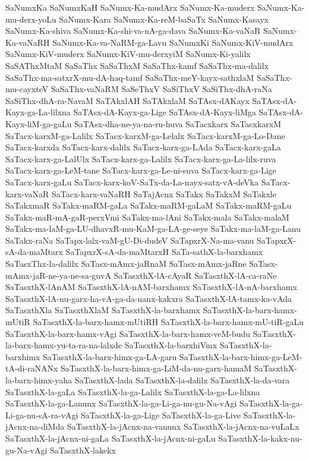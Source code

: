 {SaNumxKa
SaNumxKaH
SaNumx-Ka-mudArx
SaNumx-Ka-muderx
SaNumx-Ka-mu-derx-yoLu
SaNumx-Kara
SaNumx-Ka-reM-baSaTx
SaNumx-Kasayx
SaNumx-Ka-shiva
SaNumx-Ka-shi-va-nA-ga-dava
SaNumx-Ka-vaNaR
SaNumx-Ka-vaNaRH
SaNumx-Ka-va-NaRM-ga-Lavu
SaNumxKi
SaNumx-KiV-mudArx
SaNumx-KiV-muderx
SaNumx-KiV-mu-derxyiM
SaNumx-Ki-yalilx
SaSAThxMtaM
SaSaThx
SaSaThxM
SaSaThx-kamf
SaSaThx-ma-dalilx
SaSaThx-ma-satxrX-mu-dA-haq-tamf
SaSaThx-meY-kayx-sathxlaM
SaSaThx-mu-cayxteV
SaSaThx-vaNaRM
SaSeThxV
SaSiThxV
SaSiThx-dhA-raNa
SaSiThx-dhA-ra-NavaM
SaTAkxlAH
SaTAkxlaM
SaTAsx-dAKayx
SaTAsx-dA-Kayx-ga-La-lilxna
SaTAsx-dA-Kayx-ga-Lige
SaTAsx-dA-Kayx-liMga
SaTAsx-dA-Kayx-liM-ga-gaLu
SaTAsx-dha-ne-ya-na-ru-huva
SaTacxkarx
SaTacxkarxM
SaTacx-karxM-ga-Lalilx
SaTacx-karxM-ga-Lelalx
SaTacx-karxM-ga-Lo-Dane
SaTacx-karxda
SaTacx-karx-dalilx
SaTacx-karx-ga-LAda
SaTacx-karx-gaLa
SaTacx-karx-ga-LalUlx
SaTacx-karx-ga-Lalilx
SaTacx-karx-ga-La-lilx-ruva
SaTacx-karx-ga-LeM-tane
SaTacx-karx-ga-Le-ni-suva
SaTacx-karx-ga-Lige
SaTacx-karx-gaLu
SaTacx-karx-koV-SaTx-da-La-nayx-satx-vA-deVka
SaTacx-karx-vaNaR
SaTacx-karx-vaNaRH
SaTajAcnx
SaTakx
SaTakxM
SaTakxle
SaTakxmaR
SaTakx-maRM-gaLa
SaTakx-maRM-gaLaM
SaTakx-maRM-gaLu
SaTakx-maR-mA-gaR-perxVmi
SaTakx-ma-lAni
SaTakx-mala
SaTakx-malaM
SaTakx-ma-laM-ga-LU-dhavxR-mu-KaM-ga-LA-ge-seye
SaTakx-ma-laM-ga-Lanu
SaTakx-raNa
SaTapx-lalx-vaM-gU-Di-dudeV
SaTapxrX-Na-ma-vanu
SaTapxrX-sA-da-maMtarx
SaTapxrX-sA-da-maMtarxH
SaTa-sathX-la-barxhamx
SaTasxThx-la-dalilx
SaTasx-mAmx-jaRnaM
SaTasx-mAmx-jaRne
SaTasx-mAmx-jaR-ne-ya-ne-sa-guvA
SaTasxthX-lA-cAyaR
SaTasxthX-lA-ca-raNe
SaTasxthX-lAnAM
SaTasxthX-lA-nAM-barxhamx
SaTasxthX-lA-nA-barxhamx
SaTasxthX-lA-nu-garx-ha-vA-ga-da-nanx-kakxra
SaTasxthX-lA-tamx-ka-vAda
SaTasxthXla
SaTasxthXlaM
SaTasxthX-la-barxhamx
SaTasxthX-la-barx-hamx-mUtiR
SaTasxthX-la-barx-hamx-mUtiRH
SaTasxthX-la-barx-hamx-mU-tiR-gaLu
SaTasxthX-la-barx-hamx-vAgi
SaTasxthX-la-barx-hamx-veM-budu
SaTasxthX-la-barx-hamx-yu-ta-ra-na-lalxde
SaTasxthX-la-barxhiVmx
SaTasxthX-la-barxhimx
SaTasxthX-la-barx-himx-ga-LA-garu
SaTasxthX-la-barx-himx-ga-LeM-tA-di-raNANx
SaTasxthX-la-barx-himx-ga-LiM-da-nu-garx-hamaM
SaTasxthX-la-barx-himx-yaha
SaTasxthX-lada
SaTasxthX-la-dalilx
SaTasxthX-la-da-vara
SaTasxthX-la-gaLa
SaTasxthX-la-ga-Lalilx
SaTasxthX-la-ga-La-lilxna
SaTasxthX-la-ga-Lanunx
SaTasxthX-la-ga-Li-ga-nu-gu-Na-vAgi
SaTasxthX-la-ga-Li-ga-nu-sA-ra-vAgi
SaTasxthX-la-ga-Lige
SaTasxthX-la-ga-Live
SaTasxthX-la-jAcnx-na-diMda
SaTasxthX-la-jAcnx-na-vanunx
SaTasxthX-la-jAcnx-na-vuLaLx
SaTasxthX-la-jAcnx-ni-gaLa
SaTasxthX-la-jAcnx-ni-gaLu
SaTasxthX-la-kakx-nu-gu-Na-vAgi
SaTasxthX-lakekx
}
